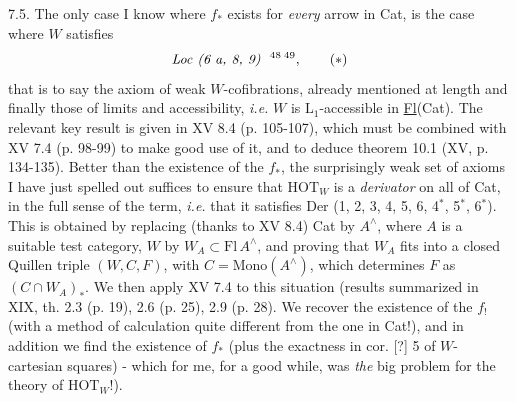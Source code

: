 \documentclass[11pt]{article}
\newcommand{\printedpage}[1]{\marginpar{\footnotesize p.~#1}}
\newcommand{\msp}[1]{\marginpar{\footnotesize [#1]}}
\begin{document}
7.5. The only case I know where $f_*$ exists for \textit{every} arrow in Cat, is the case where $W$ satisfies
\[
\textit{Loc (6 a, 8, 9)}\ \ \text{\footnotemark[48]\,\footnotemark[49]}, \tag*{$(*)$} %
\]
that is to say the axiom of weak $W$-cofibrations, already mentioned at length and finally those of limits and accessibility, \textit{i.e.} $W$ is $\mathrm{L}_1$-accessible in \underline{Fl}(Cat). The relevant key result is given in XV 8.4 (p. 105-107), which must be combined with XV 7.4 (p. 98-99) to make
\msp{page 104}
good use of it, and to deduce theorem 10.1 (XV, p. 134-135). Better than the existence of the $f_*$, the surprisingly weak set of axioms I have just spelled out suffices to ensure that $\mathrm{HOT}_W$ is a \textit{derivator} on all of Cat, in the full sense of the term, \textit{i.e.} that it satisfies Der (1, 2, 3, 4, 5, 6, 4$^*$, 5$^*$, 6$^*$). This is obtained by replacing (thanks to XV 8.4) Cat by
\printedpage{51}
$A^\wedge$, where $A$ is a suitable test category, $W$ by $W_A \subset \mathrm{Fl}\, A^\wedge$, and proving that $W_A$ fits into a closed Quillen triple $(W,C,F)$, with $C = \mathrm{Mono}(A^\wedge)$, which determines $F$ as $(C \cap W_A)_*$. We then apply XV 7.4 to this situation (results summarized in XIX, th. 2.3 (p. 19), 2.6 (p. 25), 2.9 (p. 28). We recover the existence of the $f_!$ (with a method of calculation quite different from the one in Cat!), and in addition we find the existence of $f_*$ (plus the exactness in cor. [?] 5
\msp{page 105}
of $W$-cartesian squares) - which for me, for a good while, was \textit{the} big problem for the theory of $\mathrm{HOT}_W$!).
\end{document}
